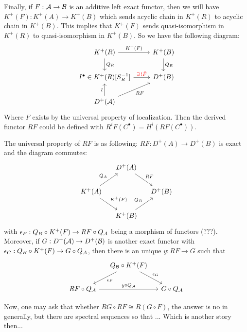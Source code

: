 Finally, if $F: \mathcal{A} \to \mathcal{B}$ is an additive left exact functor, then
we will have $K^+(F): K^+(A) \to K^+(B)$ which
sends acyclic chain in $K^+(R)$ to acyclic chain in $K^+(B)$.
This implies that $K^+(F)$ sends quasi-isomorphism in
$K^+(R)$ to quasi-isomorphism in $K^+(B)$. So
we have the following diagram:
\[ \begin{tikzcd}
  K^+(R) \ar[r, "K^+(F)"] \ar[d, "Q_R"] & K^+(B) \ar[d, "Q_R"] \\
  I^\bullet \in K^+(R)[S_R^{-1}] \ar[r, "{\color{red} \exists ! \bar{F}}"] & D^+(B) \\
    D^+(\Ac) \ar[u, "\rotatebox{90}{\(\sim\)}"] \ar[ru, "RF"']
\end{tikzcd} \]
Where $\bar{F}$ exists by the universal property of localization.
Then the derived functor $RF$ could be defined with $R^i F(C^\bullet) = H^i(RF(C^\bullet))$.

The universal property of $RF$ is as following:
$RF : D^+(A) \to D^+(B)$ is exact and the diagram commutes:
\[ \begin{tikzcd}[column sep=small]
  & D^+(A) \ar[rd, "RF"] & \\
  K^+(A) \ar[ru, "Q_A"] \ar[rd, "K^+(F)"] & & D^+(B) \\
  & K^+(B) \ar[ru, "Q_B"] &
\end{tikzcd} \]
with $\epsilon_F: Q_B \circ K^+(F) \to RF \circ Q_{\mathcal{A}}$ being
a morphism of functors (???). \\
Moreover, if $G : D^+(\mathcal{A}) \to D^+(\mathcal{B})$ is another exact functor
with $\epsilon_G : Q_B \circ K^+(F) \to G \circ Q_{\mathcal{A}}$,
then there is an unique $y: RF \to G$ such that
\[ \begin{tikzcd}[column sep=small]
  & Q_\Bc \circ K^+(F) \ar[ld, "\epsilon_F"] \ar[rd, "\epsilon_G"] & \\
  RF \circ Q_\Ac \ar[rr, "y \circ Q_\Ac"] & & G \circ Q_\Ac
\end{tikzcd} \]

Now, one may ask that whether $RG \circ RF \cong R(G \circ F)$,
the answer is no in generally, but there are spectral sequences so that ...
Which is another story then...
